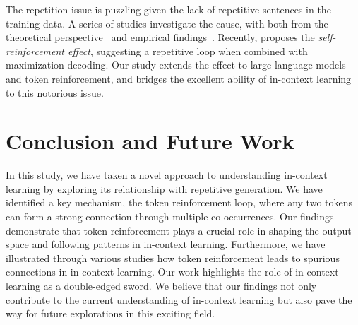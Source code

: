 \documentclass{article} %
\begin{document}
The repetition issue is puzzling given the lack of repetitive sentences in the training data. A series of studies investigate the cause, with both from the theoretical perspective~\citep{fu2020theoretical} and empirical findings~\citep{holtzman2019curious}. Recently, \cite{xu2022learning} proposes the \emph{self-reinforcement effect}, suggesting a repetitive loop when combined with maximization decoding. Our study extends the effect to large language models and token reinforcement, and bridges the excellent ability of in-context learning to this notorious issue. 



\section{Conclusion and Future Work}
In this study, we have taken a novel approach to understanding in-context learning by exploring its relationship with repetitive generation. We have identified a key mechanism, the token reinforcement loop, where any two tokens can form a strong connection through multiple co-occurrences. 
Our findings demonstrate that token reinforcement plays a crucial role in shaping the output space and following patterns in in-context learning. Furthermore, we have illustrated through various studies how token reinforcement leads to spurious connections in in-context learning. 
Our work highlights the role of in-context learning as a double-edged sword. 
We believe that our findings not only contribute to the current understanding of in-context learning but also pave the way for future explorations in this exciting field.
\end{document}
